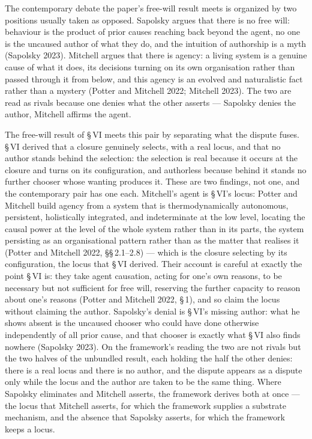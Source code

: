 \documentclass[11pt,oneside]{report}
\theoremstyle{definition}
\theoremstyle{remark}
\begin{document}
The contemporary debate the paper's free-will result meets is organized by two positions usually taken as opposed. Sapolsky argues that there is no free will: behaviour is the product of prior causes reaching back beyond the agent, no one is the uncaused author of what they do, and the intuition of authorship is a myth (Sapolsky 2023). Mitchell argues that there is agency: a living system is a genuine cause of what it does, its decisions turning on its own organisation rather than passed through it from below, and this agency is an evolved and naturalistic fact rather than a mystery (Potter and Mitchell 2022; Mitchell 2023). The two are read as rivals because one denies what the other asserts --- Sapolsky denies the author, Mitchell affirms the agent.

The free-will result of \S\,VI meets this pair by separating what the dispute fuses. \S\,VI derived that a closure genuinely selects, with a real locus, and that no author stands behind the selection: the selection is real because it occurs at the closure and turns on its configuration, and authorless because behind it stands no further chooser whose wanting produces it. These are two findings, not one, and the contemporary pair has one each. Mitchell's agent is \S\,VI's locus: Potter and Mitchell build agency from a system that is thermodynamically autonomous, persistent, holistically integrated, and indeterminate at the low level, locating the causal power at the level of the whole system rather than in its parts, the system persisting as an organisational pattern rather than as the matter that realises it (Potter and Mitchell 2022, \S\S\,2.1--2.8) --- which is the closure selecting by its configuration, the locus that \S\,VI derived. Their account is careful at exactly the point \S\,VI is: they take agent causation, acting for one's own reasons, to be necessary but not sufficient for free will, reserving the further capacity to reason about one's reasons (Potter and Mitchell 2022, \S\,1), and so claim the locus without claiming the author. Sapolsky's denial is \S\,VI's missing author: what he shows absent is the uncaused chooser who could have done otherwise independently of all prior cause, and that chooser is exactly what \S\,VI also finds nowhere (Sapolsky 2023). On the framework's reading the two are not rivals but the two halves of the unbundled result, each holding the half the other denies: there is a real locus and there is no author, and the dispute appears as a dispute only while the locus and the author are taken to be the same thing. Where Sapolsky eliminates and Mitchell asserts, the framework derives both at once --- the locus that Mitchell asserts, for which the framework supplies a substrate mechanism, and the absence that Sapolsky asserts, for which the framework keeps a locus.
\end{document}
